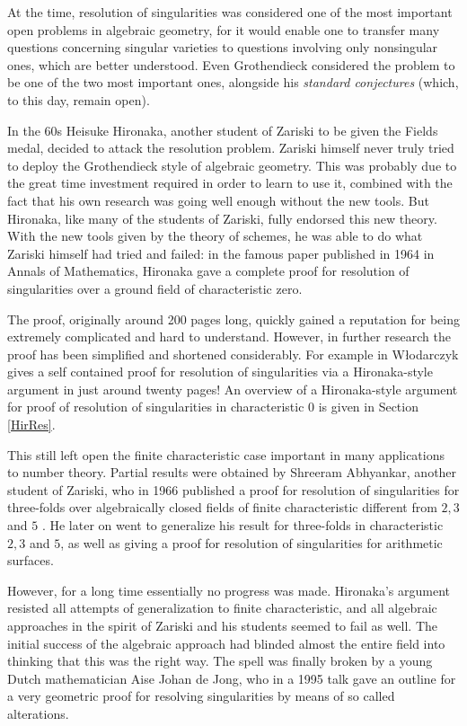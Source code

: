 \documentclass[12pt,a4paper,leqno]{article}
\newcommand{\fref}[1]{\hyperref[{#1}]{\ref*{#1}}}
\theoremstyle{plain}
\theoremstyle{definition}
\theoremstyle{remark}
\begin{document}
At the time, resolution of singularities was considered one of the most important open problems in algebraic geometry, for it would enable one to transfer many questions concerning singular varieties to questions involving only nonsingular ones, which are better understood. Even Grothendieck considered the problem to be one of the two most important ones, alongside his \emph{standard conjectures} (which, to this day, remain open).

In the 60s Heisuke Hironaka, another student of Zariski to be given the Fields medal, decided to attack the resolution problem. Zariski himself never truly tried to deploy the Grothendieck style of algebraic geometry. This was probably due to the great time investment required in order to learn to use it, combined with the fact that his own research was going well enough without the new tools. \cite{Par} But Hironaka, like many of the students of Zariski, fully endorsed this new theory. With the new tools given by the theory of schemes, he was able to do what Zariski himself had tried and failed: in the famous paper published in 1964 in Annals of Mathematics, Hironaka gave a complete proof for resolution of singularities over a ground field of characteristic zero. 

The proof, originally around 200 pages long, quickly gained a reputation for being extremely complicated and hard to understand. However, in further research the proof has been simplified and shortened considerably. For example in \cite{Wlo} W\l{}odarczyk gives a self contained proof for resolution of singularities via a Hironaka-style argument in just around twenty pages! An overview of a Hironaka-style argument for proof of resolution of singularities in characteristic 0 is given in Section \fref{HirRes}.

This still left open the finite characteristic case important in many applications to number theory. Partial results were obtained by Shreeram Abhyankar, another student of Zariski, who in 1966 published a proof for resolution of singularities for three-folds over algebraically closed fields of finite characteristic different from $2,3$ and $5$ \cite{HLOQ}. He later on went to generalize his result for three-folds in characteristic $2,3$ and $5$, as well as giving a proof for resolution of singularities for arithmetic surfaces.

However, for a long time essentially no progress was made. Hironaka's argument resisted all attempts of generalization to finite characteristic, and all algebraic approaches in the spirit of Zariski and his students seemed to fail as well. The initial success of the algebraic approach had blinded almost the entire field into thinking that this was the right way. The spell was finally broken by a young Dutch mathematician Aise Johan de Jong, who in a 1995 talk gave an outline for a very geometric proof for resolving singularities by means of so called alterations. 
\end{document}
